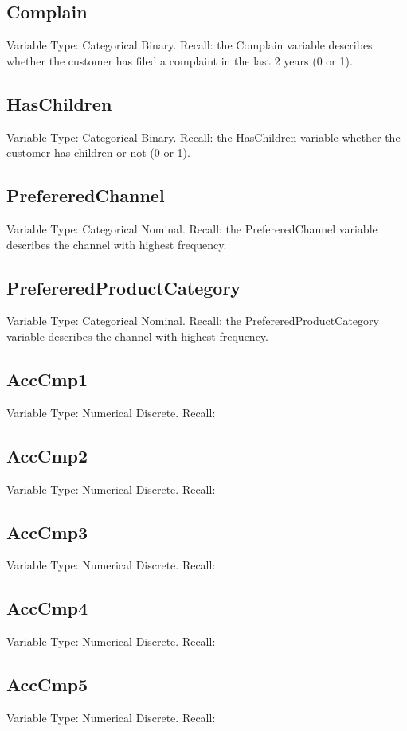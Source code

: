 \subsection{Complain}
Variable Type: Categorical Binary.\newline
Recall: the Complain variable describes whether the customer has filed a complaint in the last 2 years (0 or 1).
\subsection{HasChildren}
Variable Type: Categorical Binary.\newline
Recall: the HasChildren variable  whether the customer has children or not (0 or 1).

\subsection{PrefereredChannel}
Variable Type: Categorical Nominal.\newline
Recall: the PrefereredChannel variable describes the channel with highest frequency.
\subsection{PrefereredProductCategory}
Variable Type: Categorical Nominal.\newline
Recall: the PrefereredProductCategory variable describes the channel with highest frequency.
\subsection{AccCmp1}
Variable Type: Numerical Discrete.\newline
Recall: 
\subsection{AccCmp2}
Variable Type: Numerical Discrete.\newline
Recall: 
\subsection{AccCmp3}
Variable Type: Numerical Discrete.\newline
Recall: 
\subsection{AccCmp4}
Variable Type: Numerical Discrete.\newline
Recall: 
\subsection{AccCmp5}
Variable Type: Numerical Discrete.\newline
Recall: 
